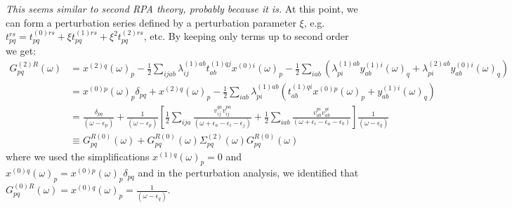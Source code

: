 \emph{This seems similar to second RPA theory, probably because it is.}
At this point, we can form a perturbation series defined by a perturbation parameter $\xi$, e.g. $t_{p q}^{r s}=t_{p q}^{(0) r s}+\xi t_{p q}^{(1) r s}+\xi^2 t_{p q}^{(2) r s}$, etc. By keeping only terms up to second order we get:
\begin{align}
G_{p q}^{(2)R}(\omega) &= x^{(2) q}(\omega)_p-\frac{1}{2} \sum_{i j a b} \lambda_{i j}^{(1) a b} t_{a b}^{(1) q j} x^{(0) i}(\omega)_p-\frac{1}{2} \sum_{i a b}\left(\lambda_{p i}^{(1) a b} y_{a b}^{(1) i}(\omega)_q+\lambda_{p i}^{(2) a b} y_{a b}^{(0) i}(\omega)_q\right) \\
&= x^{(0) p}(\omega)_p \delta_{p q}+x^{(2) q}(\omega)_p-\frac{1}{2} \sum_{i a b} \lambda_{p i}^{(1) a b}\left(t_{a b}^{(1) q i} x^{(0) p}(\omega)_p+y_{a b}^{(1) i}(\omega)_q\right) \\
&= \frac{\delta_{pq}}{(\omega-\epsilon_p)} + \frac{1}{(\omega-\epsilon_p)} \left[ \frac{1}{2}\sum_{ija} \frac{v^{qa}_{ij}v^{pa}_{ij}}{(\omega+\epsilon_a-\epsilon_i-\epsilon_j)} + \frac{1}{2}\sum_{iab} \frac{v^{pi}_{ab}v^{qi}_{ab}}{(\omega+\epsilon_i-\epsilon_a-\epsilon_b)} \right] \frac{1}{(\omega-\epsilon_q)} \\
&\equiv G_{pq}^{R(0)} (\omega) + G_{pq}^{R(0)} (\omega) \Sigma_{pq}^{(2)}(\omega) G_{pq}^{R(0)} (\omega)
\end{align}
 where we used the simplifications $x^{(1) q}(\omega)_p=0$ and $x^{(0) q}(\omega)_p=x^{(0) p}(\omega)_p \delta_{p q}$ and in the perturbation analysis, we identified that $G_{p q}^{(0) R}(\omega)=x^{(0) q}(\omega)_p= \frac{1}{(\omega-\epsilon_q)}$.

